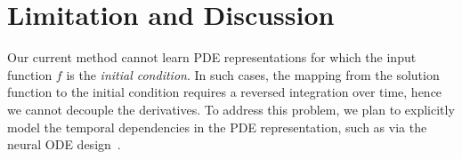 \section{Limitation and Discussion}\label{sect:limit}
Our current method cannot learn PDE representations for which the input function $f$ is the \textit{initial condition}. In such cases, the mapping from the solution function to the initial condition requires a reversed integration over time, hence we cannot decouple the derivatives. To address this problem, we plan to explicitly model the temporal dependencies in the PDE representation, such as via the neural ODE design~\citep{chen2018neural}. 

  


 
